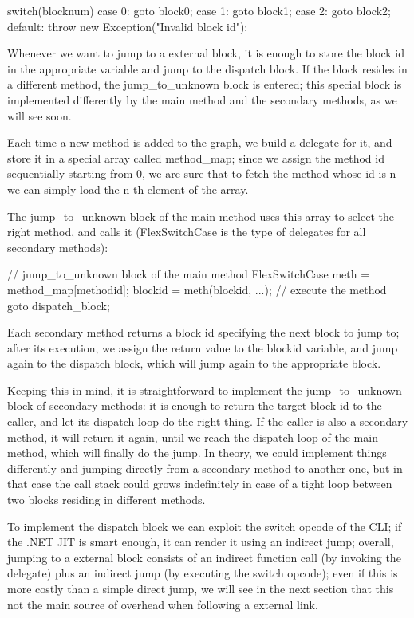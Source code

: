 {switch(blocknum) {
case 0:
goto block0;
case 1:
goto block1;
case 2:
goto block2;
default:
throw new Exception("Invalid block id");
}

Whenever we want to jump to a external block, it is enough to store the block id in the appropriate variable and jump to the dispatch block. If the block resides in a different method, the jump_to_unknown block is entered; this special block is implemented differently by the main method and the secondary methods, as we will see soon.

Each time a new method is added to the graph, we build a delegate for it, and store it in a special array called method_map; since we assign the method id sequentially starting from 0, we are sure that to fetch the method whose id is n we can simply load the n-th element of the array.

The jump_to_unknown block of the main method uses this array to select the right method, and calls it (FlexSwitchCase is the type of delegates for all secondary methods):

// jump_to_unknown block of the main method
FlexSwitchCase meth = method_map[methodid];
blockid = meth(blockid, ...); // execute the method
goto dispatch_block;

Each secondary method returns a block id specifying the next block to jump to; after its execution, we assign the return value to the blockid variable, and jump again to the dispatch block, which will jump again to the appropriate block.

Keeping this in mind, it is straightforward to implement the jump_to_unknown block of secondary methods: it is enough to return the target block id to the caller, and let its dispatch loop do the right thing. If the caller is also a secondary method, it will return it again, until we reach the dispatch loop of the main method, which will finally do the jump. In theory, we could implement things differently and jumping directly from a secondary method to another one, but in that case the call stack could grows indefinitely in case of a tight loop between two blocks residing in different methods.

To implement the dispatch block we can exploit the switch opcode of the CLI; if the .NET JIT is smart enough, it can render it using an indirect jump; overall, jumping to a external block consists of an indirect function call (by invoking the delegate) plus an indirect jump (by executing the switch opcode); even if this is more costly than a simple direct jump, we will see in the next section that this not the main source of overhead when following a external link.

}
